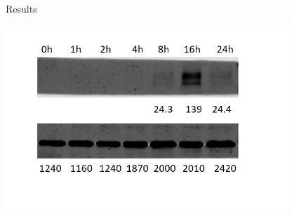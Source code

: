 \documentclass[aspectratio=1610]{beamer}					%
\begin{document}
\begin{frame}{Results}
\begin{center}
\includegraphics[width=0.8\textwidth]{blot.png}
\end{center}
\end{frame}
\end{document}
